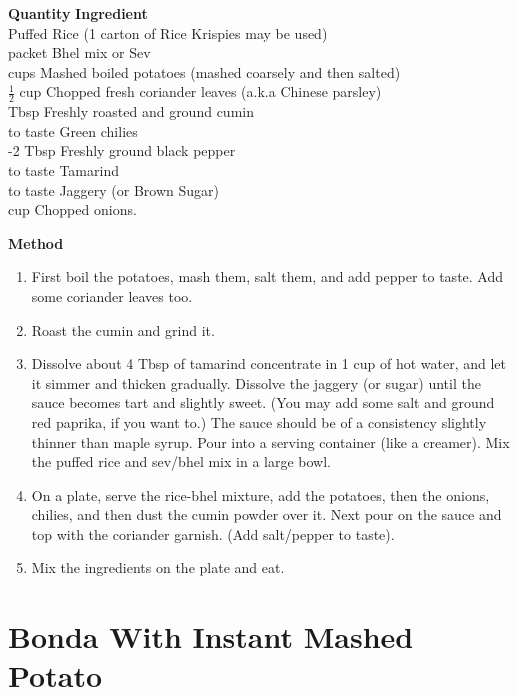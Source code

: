 \begin{tabbing}
\hspace{1.0cm}  \={\bf Quantity}   \hspace{3.0cm} \={\bf Ingredient}\\
\>   \>Puffed Rice (1 carton of Rice Krispies may be used)\\
 packet \>Bhel  mix or Sev \\
 cups \>Mashed boiled potatoes (mashed coarsely and then salted)\\
\>$\frac{1}{2}$ cup \>Chopped fresh coriander leaves (a.k.a Chinese parsley)\\
 Tbsp \>Freshly roasted and ground cumin\\
\> to taste   \>Green chilies \\
-2 Tbsp \>Freshly ground black pepper\\
\> to taste   \>Tamarind \\
\> to taste   \>Jaggery (or Brown Sugar)\\
 cup \>Chopped onions.\\
\end{tabbing}

{\bf Method}
\begin{enumerate}
   \item First boil the potatoes, mash them, salt  them,  and add  pepper  to
     taste.  Add some coriander leaves too.
   \item Roast the cumin and grind it.
   \item Dissolve  about 4 Tbsp of tamarind concentrate in 1 cup of hot water,
     and let it simmer and thicken  gradually.  Dissolve  the  jaggery  (or
     sugar)  until  the sauce becomes tart and slightly sweet. (You may add
     some salt and ground red paprika, if you want to.) The  sauce  should
     be  of  a  consistency slightly thinner than maple syrup. Pour into a
     serving container (like a creamer).  Mix the puffed rice and sev/bhel
     mix in a large bowl.
   \item On  a  plate,  serve  the  rice-bhel  mixture,  add  the
     potatoes, then the onions, chilies, and then dust the cumin powder  over  it.
     Next pour on the sauce and top with the coriander garnish. (Add salt/pepper
     to taste).
   \item Mix the ingredients on the plate and eat.
\end{enumerate}

\section{Bonda With Instant Mashed Potato}

